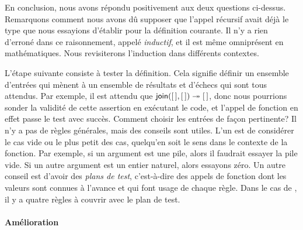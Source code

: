 En conclusion, nous avons répondu positivement aux deux questions
ci-dessus. Remarquons comment nous avons dû supposer que l'appel
récursif avait déjà le type que nous essayions d'établir pour la
définition courante. Il n'y a rien d'erroné dans ce raisonnement,
appelé \emph{inductif}, et il est même omniprésent en
mathématiques. Nous revisiterons l'induction dans différents
contextes.

L'étape suivante consiste à tester la définition. Cela signifie
définir un ensemble d'entrées qui mènent à un ensemble de résultats et
d'échecs qui sont tous attendus. Par exemple, il est attendu que
\(\textsf{join}([\,],[\,]) \twoheadrightarrow [\,]\), donc nous pourrions
sonder la validité de cette assertion en exécutant le code, et l'appel
de fonction en effet passe le test avec succès. Comment choisir les
entrées de façon pertinente? Il n'y a pas de règles générales, mais
des conseils sont utiles. L'un est de considérer le cas vide ou le
plus petit des cas, quelqu'en soit le sens dans le contexte de la
fonction. Par exemple, si un argument est une pile, alors il faudrait
essayer la pile vide. Si un autre argument est un entier naturel,
alors essayons zéro. Un autre conseil est d'avoir des \emph{plans de
  test}, c'est-à-dire des appels de fonction dont les valeurs sont
connues à l'avance et qui font usage de chaque règle. Dans le cas de
, il y a quatre règles à couvrir avec le plan de test.
 

\paragraph{Amélioration}

